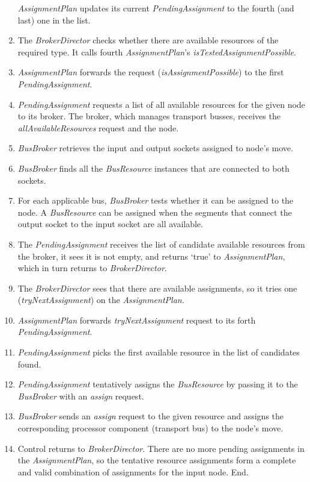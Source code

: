 \documentclass[a4paper,twoside]{tce}
\begin{document}
\begin{enumerate}
  \emph{AssignmentPlan} updates its current \emph{PendingAssignment} to the
  fourth (and last) one in the list.
\item %
  The \emph{BrokerDirector} checks whether there are available resources of
  the required type. It calls fourth \emph{AssignmentPlan}'s
  \emph{isTestedAssignmentPossible}.
\item %
  \emph{AssignmentPlan} forwards the request (\emph{isAssignmentPossible})
  to the first \emph{PendingAssignment}.
\item %
  \emph{PendingAssignment} requests a list of all available resources for
  the given node to its broker. The broker, which manages transport busses,
  receives the \emph{allAvailableResources} request and the node.
\item %
  \emph{BusBroker} retrieves the input and output sockets assigned to node's
  move.
\item %
  \emph{BusBroker} finds all the \emph{BusResource} instances that are
  connected to both sockets.
\item %
  For each applicable bus, \emph{BusBroker} tests whether it can be assigned
  to the node. A \emph{BusResource} can be assigned when the segments that
  connect the output socket to the input socket are all available.
\item %
  The \emph{PendingAssignment} receives the list of candidate available
  resources from the broker, it sees it is not empty, and returns `true' to
  \emph{AssignmentPlan}, which in turn returns to \emph{BrokerDirector}.
\item %
  The \emph{BrokerDirector} sees that there are available assignments, so it
  tries one (\emph{tryNextAssignment}) on the \emph{AssignmentPlan}.
\item %
  \emph{AssignmentPlan} forwards \emph{tryNextAssignment} request to its
  forth \emph{PendingAssignment}.
\item %
  \emph{PendingAssignment} picks the first available resource in the list of
  candidates found.
\item %
  \emph{PendingAssignment} tentatively assigns the \emph{BusResource} by
  passing it to the \emph{BusBroker} with an \emph{assign} request.
\item %
  \emph{BusBroker} sends an \emph{assign} request to the given resource and
  assigns the corresponding processor component (transport bus) to the
  node's move.
\item %
  Control returns to \emph{BrokerDirector}. There are no more pending
  assignments in the \emph{AssignmentPlan}, so the tentative resource
  assignments form a complete and valid combination of assignments for the
  input node. End.
\end{enumerate}
\end{document}
